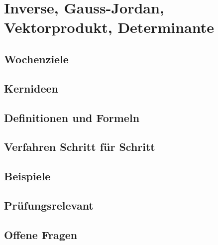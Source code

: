 \chapter{Inverse, Gauss-Jordan, Vektorprodukt, Determinante}
\label{kap:04-inverse-determinante}

\section*{Wochenziele}
\begin{wochenziele}
\end{wochenziele}

\section{Kernideen}

\section{Definitionen und Formeln}

\section{Verfahren Schritt für Schritt}

\section{Beispiele}

\section{Prüfungsrelevant}

\section{Offene Fragen}
